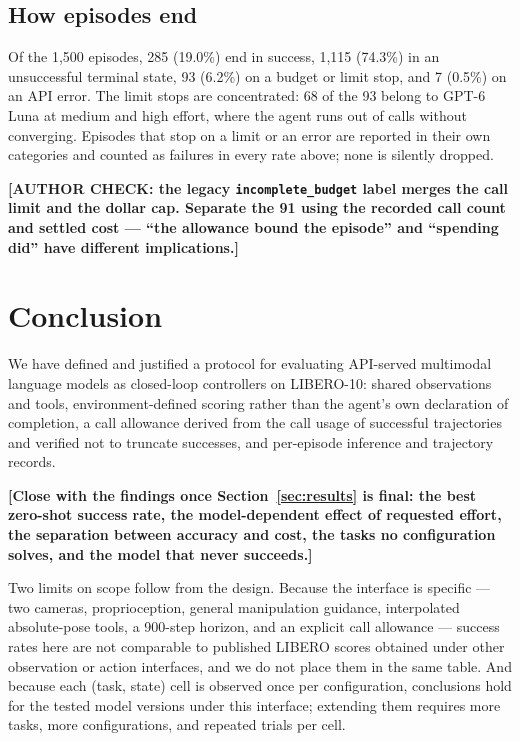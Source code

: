 \documentclass[11pt]{article}
\newcommand{\placeholder}[1]{\textbf{[#1]}}
\begin{document}
\subsection{How episodes end}
\label{sec:res:termination}
Of the 1,500 episodes, 285 (19.0\%) end in success, 1,115 (74.3\%) in an
unsuccessful terminal state, 93 (6.2\%) on a budget or limit stop, and 7
(0.5\%) on an API error. The limit stops are concentrated: 68 of the 93 belong
to GPT-6 Luna at medium and high effort, where the agent runs out of calls
without converging. Episodes that stop on a limit or an error are reported in
their own categories and counted as failures in every rate above; none is
silently dropped.

\placeholder{AUTHOR CHECK: the legacy \texttt{incomplete\_budget} label merges
the call limit and the dollar cap. Separate the 91 using the recorded call
count and settled cost --- ``the allowance bound the episode'' and ``spending
did'' have different implications.}

\section{Conclusion}
We have defined and justified a protocol for evaluating API-served multimodal
language models as closed-loop controllers on LIBERO-10: shared observations
and tools, environment-defined scoring rather than the agent's own declaration
of completion, a call allowance derived from the call usage of successful
trajectories and verified not to truncate successes, and per-episode inference
and trajectory records.

\placeholder{Close with the findings once Section~\ref{sec:results} is final:
the best zero-shot success rate, the model-dependent effect of requested effort, the
separation between accuracy and cost, the tasks no configuration solves, and
the model that never succeeds.}

Two limits on scope follow from the design. Because the interface is specific
--- two cameras, proprioception, general manipulation guidance, interpolated
absolute-pose tools, a 900-step horizon, and an explicit call allowance ---
success rates here are not comparable to published LIBERO scores obtained
under other observation or action interfaces, and we do not place them in the
same table. And because each (task, state) cell is observed once per
configuration, conclusions hold for the tested model versions under this
interface; extending them requires more tasks, more configurations, and
repeated trials per cell.
\end{document}
